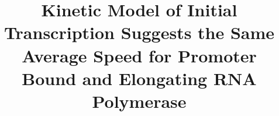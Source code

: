 \documentclass{bmcart}
\begin{document}
\begin{frontmatter}

\begin{fmbox}


\title{Kinetic Model of Initial Transcription Suggests the Same Average Speed
for Promoter Bound and Elongating RNA Polymerase}


\author[
   addressref={aff1},                   %
]{ }
\author[
   addressref={aff1},
   email={nadi.bar@ntnu.no}
]{ }


\address[id=aff1]{%
  , %
  ,                     %
  ,                              %
\\
Emails: JS: jorgsk@nt.ntnu.no, NB: nadi.bar@ntnu.no$^*$ 
}


\end{fmbox}
\end{frontmatter}
\end{document}
